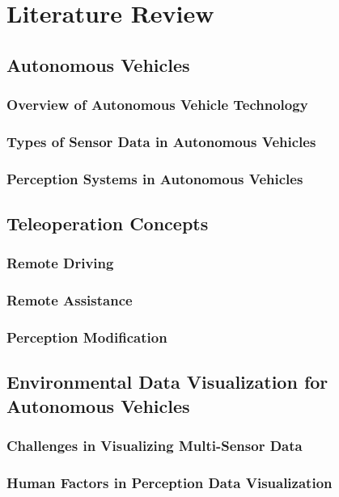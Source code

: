
\chapter{Literature Review}\label{chapter:literaturereview}

\section{Autonomous Vehicles}
\cite{Feiler2021ThePM}
\subsection{Overview of Autonomous Vehicle Technology}
\subsection{Types of Sensor Data in Autonomous Vehicles}
\subsection{Perception Systems in Autonomous Vehicles}

\section{Teleoperation Concepts}
\subsection{Remote Driving}
\subsection{Remote Assistance}
\subsection{Perception Modification}

\section{Environmental Data Visualization for Autonomous Vehicles}
\subsection{Challenges in Visualizing Multi-Sensor Data}
\subsection{Human Factors in Perception Data Visualization}

